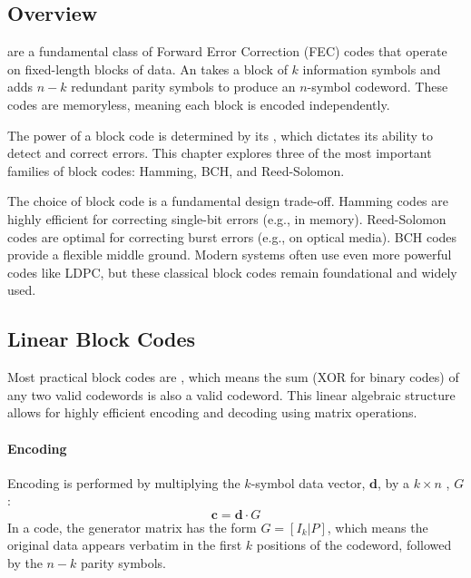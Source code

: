 \subsection{Overview}

 are a fundamental class of Forward Error Correction (FEC) codes that operate on fixed-length blocks of data. An  takes a block of $k$ information symbols and adds $n-k$ redundant parity symbols to produce an $n$-symbol codeword. These codes are memoryless, meaning each block is encoded independently.

The power of a block code is determined by its , which dictates its ability to detect and correct errors. This chapter explores three of the most important families of block codes: Hamming, BCH, and Reed-Solomon.

\begin{keyconcept}
    The choice of block code is a fundamental design trade-off. Hamming codes are highly efficient for correcting single-bit errors (e.g., in memory). Reed-Solomon codes are optimal for correcting burst errors (e.g., on optical media). BCH codes provide a flexible middle ground. Modern systems often use even more powerful codes like LDPC, but these classical block codes remain foundational and widely used.
\end{keyconcept}


\subsection{Linear Block Codes}

Most practical block codes are , which means the sum (XOR for binary codes) of any two valid codewords is also a valid codeword. This linear algebraic structure allows for highly efficient encoding and decoding using matrix operations.

\paragraph{Encoding}
Encoding is performed by multiplying the $k$-symbol data vector, $\mathbf{d}$, by a $k \times n$ , $G$:
\begin{equation}
    \mathbf{c} = \mathbf{d} \cdot G
\end{equation}
In a  code, the generator matrix has the form $G = [I_k | P]$, which means the original data appears verbatim in the first $k$ positions of the codeword, followed by the $n-k$ parity symbols.

